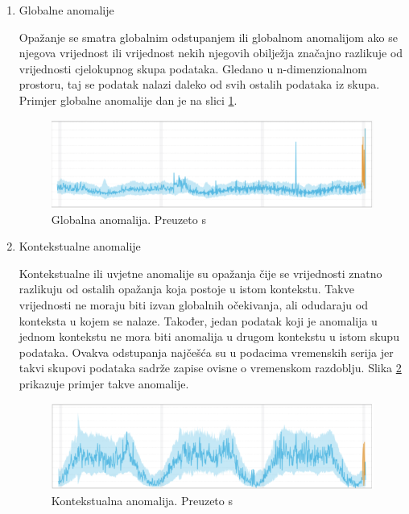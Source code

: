 \documentclass[utf8, diplomski, numeric]{fer}
\begin{document}
\begin{enumerate}
\item Globalne anomalije

Opažanje se smatra globalnim odstupanjem ili globalnom anomalijom ako se njegova vrijednost ili vrijednost nekih njegovih obilježja značajno razlikuje od vrijednosti cjelokupnog skupa podataka. Gledano u n-dimenzionalnom prostoru, taj se podatak nalazi daleko od svih ostalih podataka iz skupa. Primjer globalne anomalije dan je na slici \ref{fig:outlier1}.

\begin{figure}[htb]
\includegraphics[width=1\textwidth]{images/outlier_type1.png}
\centering
\caption{Globalna anomalija. Preuzeto s  \cite{OutlierAnalysis}}
\label{fig:outlier1}
\end{figure}

\item Kontekstualne anomalije

Kontekstualne ili uvjetne anomalije su opažanja čije se vrijednosti znatno razlikuju od ostalih opažanja koja postoje u istom kontekstu. Takve vrijednosti ne moraju biti izvan globalnih očekivanja, ali odudaraju od konteksta u kojem se nalaze. Također, jedan podatak koji je anomalija u jednom kontekstu ne mora biti anomalija u drugom kontekstu u istom skupu podataka. Ovakva odstupanja najčešća su u podacima vremenskih serija jer takvi skupovi podataka sadrže zapise ovisne o vremenskom razdoblju. Slika \ref{fig:outlier2} prikazuje primjer takve anomalije.

\begin{figure}[htb]
\includegraphics[width=1\textwidth]{images/outlier_type2.png}
\centering
\caption{Kontekstualna anomalija. Preuzeto s  \cite{OutlierAnalysis}}
\label{fig:outlier2}
\end{figure}


\end{enumerate}
\end{document}

